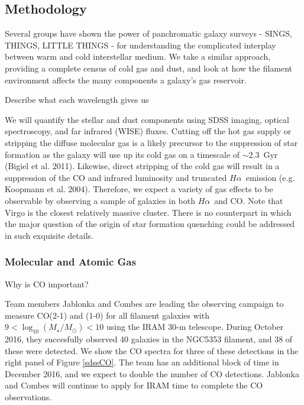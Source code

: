 \documentclass[11pt, preprint]{aastex}
\newcommand{\ha}{$H\alpha$}
\begin{document}
\vspace*{-.8cm}\subsection{Methodology} 
\vspace*{-.2cm}
Several groups have shown the power of panchromatic galaxy surveys -
SINGS, THINGS, LITTLE THINGS - for understanding the complicated
interplay between warm and cold interstellar medium.  We take a
similar approach, providing a complete census of cold gas and dust,
and look at how the filament environment affects the many components a galaxy's gas reservoir.

Describe what each wavelength gives us

We will quantify the stellar and dust components using
SDSS imaging, optical spectroscopy, and
far infrared (WISE) fluxes.  Cutting off the hot gas supply or stripping the diffuse molecular gas
is a likely precursor to the suppression of star formation as the
galaxy will use up its cold gas on a timescale of $\sim 2.3$~Gyr
(Bigiel et al. 2011).  Likewise, direct stripping of the cold gas will
result in a suppression of the CO and infrared luminosity and
truncated \ha \ emission (e.g. Koopmann et al. 2004).  Therefore,
we expect a variety of gas effects to be observable by observing a
sample of galaxies in both \ha \ and CO.
Note that Virgo is the closest relatively massive cluster. There is no counterpart
in which the major question of the origin of star formation quenching could be
addressed in such exquisite details.



\vspace*{-1cm}
\subsubsection{Molecular and Atomic Gas}
\vspace*{-.3cm}
Why is CO important?

Team members Jablonka and Combes are leading the observing campaign to
measure CO(2-1) and (1-0)  for all filament galaxies with $9 <
\log_{10}(M_\star/M_\odot) < 10$ using the IRAM 30-m telescope.
During October 2016, they succesfully observed 40 galaxies in the
NGC5353 filament, and 38 of these were detected.  We show the CO
spectra for three of these detections in the right panel of Figure
\ref{sdssCO}.  The team has an additional block of time in December
2016, and we expect to double the number of CO detections.  Jablonka
and Combes will continue to apply for IRAM time to complete the CO observations.
\end{document}
